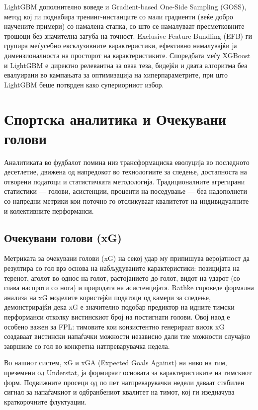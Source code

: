 LightGBM дополнително воведе и Gradient-based One-Side Sampling (GOSS), метод кој ги поднабира тренинг-инстанците со мали градиенти (веќе добро научените примери) со намалена стапка, со што се намалуваат пресметковните трошоци без значителна загуба на точност. Exclusive Feature Bundling (EFB) ги групира меѓусебно ексклузивните карактеристики, ефективно намалувајќи ја димензионалноста на просторот на карактеристиките. Споредбата меѓу XGBoost и LightGBM е директно релевантна за оваа теза, бидејќи и двата алгоритма беа евалуирани во кампањата за оптимизација на хиперпараметрите, при што LightGBM беше потврден како супериорниот избор.

\section{Спортска аналитика и Очекувани голови}

Аналитиката во фудбалот помина низ трансформациска еволуција во последното десетлетие, движена од напредокот во технологиите за следење, достапноста на отворени податоци и статистичката методологија. Традиционалните агрегирани статистики — голови, асистенции, проценти на поседување — беа надополнети со напредни метрики кои поточно го отсликуваат квалитетот на индивидуалните и колективните перформанси.

\subsection{Очекувани голови (xG)}

Метриката за очекувани голови (xG) на секој удар му припишува веројатност да резултира со гол врз основа на набљудуваните карактеристики: позицијата на теренот, аголот во однос на голот, растојанието до голот, видот на ударот (со глава наспроти со нога) и природата на асистенцијата. Rathke \cite{rathke2017expected} спроведе формална анализа на xG моделите користејќи податоци од камери за следење, демонстрирајќи дека xG е значително подобар предиктор на идните тимски перформанси отколку вистинскиот број на постигнати голови. Овој наод е особено важен за FPL: тимовите кои конзистентно генерираат висок xG создаваат вистински напаѓачки можности независно дали тие можности случајно завршиле со гол во конкретна натпреварувачка недела.

Во нашиот систем, xG и xGA (Expected Goals Against) на ниво на тим, преземени од Understat, ја формираат основата за карактеристиките на тимскиот форм. Подвижните просеци од по пет натпреварувачки недели даваат стабилен сигнал за напаѓачкиот и одбранбениот квалитет на тимот, кој ги изедначува краткорочните флуктуации.

